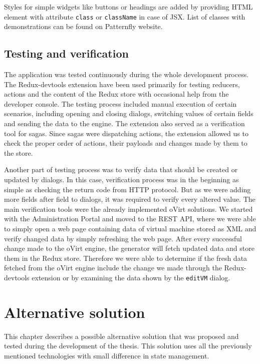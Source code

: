 Styles for simple widgets like buttons or headings are added by providing HTML element with attribute \texttt{class} or \texttt{className} in case of JSX. List of classes with demonstrations can be found on Patternfly website\cite{Patternfly}. 

\newpage
\section{Testing and verification}
The application was tested continuously during the whole development process. The Redux-devtools extension have been used primarily for testing reducers, actions and the content of the Redux store with occasional help from the developer console. The testing process included manual execution of certain scenarios, including opening and closing dialogs, switching values of certain fields and sending the data to the engine. The extension also served as a verification tool for sagas. Since sagas were dispatching actions, the extension allowed us to check the proper order of actions, their payloads and changes made by them to the store.

Another part of testing process was to verify data that should be created or updated by dialogs. In this case, verification process was in the beginning as simple as checking the return code from HTTP protocol. But as we were adding more fields after field to dialogs, it was required to verify every altered value. The main verification tools were the already implemented oVirt solutions. We started with the Administration Portal and moved to the REST API, where we were able to simply open a web page containing data of virtual machine stored as XML and verify changed data by simply refreshing the web page. After every successful change made to the oVirt engine, the generator will fetch updated data and store them in the Redux store. Therefore we were able to determine if the fresh data fetched from the oVirt engine include the change we made through the Redux-devtools extension or by examining the data shown by the \texttt{editVM} dialog.

\chapter{Alternative solution}
This chapter describes a possible alternative solution that was proposed and tested during the development of the thesis. This solution uses all the previously mentioned technologies with small difference in state management.

